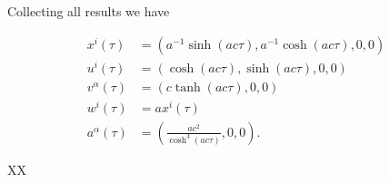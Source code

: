 {Collecting all results we have

\begin{equation}\label{eqn:relativisticElectrodynamicsT2:150}
\begin{aligned}
x^i(\tau) &= \left( a^{-1} \sinh( a c \tau), a^{-1} \cosh( a c \tau ), 0, 0 \right) \\
u^i(\tau) &= \left( \cosh( a c \tau ), \sinh( a c \tau ), 0, 0\right) \\
v^\alpha(\tau) &= \left( c \tanh(a c \tau), 0, 0 \right) \\
w^i(\tau) &= a x^i(\tau) \\
a^\alpha(\tau) &= \left( \frac{a c^2}{\cosh^3 (a c \tau)}, 0, 0 \right).
\end{aligned}
\end{equation}

} %

XX
